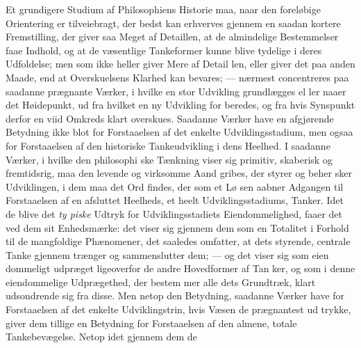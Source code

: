Et grundigere Studium af Philosophiens Historie maa,
naar den foreløbige Orientering er tilveiebragt, der bedst kan
erhverves gjennem en saadan kortere Fremstilling, der giver
saa Meget af Detaillen, at de almindelige Bestemmelser faae
Indhold, og at de væsentlige Tankeformer kunne blive tydelige
i deres Udfoldelse; men som ikke heller giver Mere af Detail\-%
len, eller giver det paa anden Maade, end at Overskuelsens
Klarhed kan bevares; --- nærmest concentreres paa saadanne
prægnante Værker, i hvilke en stor Udvikling grundlægges el\-%
ler naaer det Høidepunkt, ud fra hvilket en ny Udvikling for\-%
beredes, og fra hvis Synspunkt derfor en viid Omkreds klart
overskues. Saadanne Værker have en afgjørende Betydning
ikke blot for Forstaaelsen af det enkelte Udviklingsstadium,
men ogsaa for Forstaaelsen af den historiske Tankeudvikling
i dens Heelhed. I saadanne Værker, i hvilke den philosophi\-%
ske Tænkning viser sig primitiv, skaberisk og fremtidsrig, maa
den levende og virksomme Aand gribes, der styrer og beher\-%
sker Udviklingen, i dem maa det Ord findes, der som et Lø\-%
sen aabner Adgangen til Forstaaelsen af en afsluttet Heelheds,
et heelt Udviklingsstadiums, Tanker. Idet de blive det \emph{ty\-%
piske} Udtryk for Udviklingsstadiets Eiendommelighed, faaer
det ved dem sit Enhedsmærke: det viser sig gjennem dem som
en Totalitet i Forhold til de mangfoldige Phænomener, det
saaledes omfatter, at dets styrende, centrale Tanke gjennem\-%
trænger og sammenslutter dem; --- og det viser sig som eien\-%
dommeligt udpræget ligeoverfor de andre Hovedformer af Tan\-%
ker, og som i denne eiendommelige Udprægethed, der bestem\-%
mer alle dets Grundtræk, klart udsondrende sig fra disse. Men
netop den Betydning, saadanne Værker have for Forstaaelsen
af det enkelte Udviklingstrin, hvis Væsen de prægnantest ud\-%
trykke, giver dem tillige en Betydning for Forstaaelsen af den
almene, totale Tankebevægelse. Netop idet gjennem dem de

